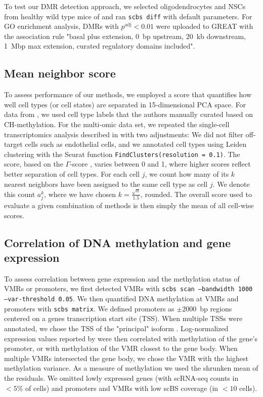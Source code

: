 \documentclass[twocolumn,10pt]{article}
\begin{document}
To test our DMR detection approach, we selected oligodendrocytes and NSCs from healthy wild type mice of \citet{kremer_scnmt} and ran \texttt{scbs diff} with default parameters.
For GO enrichment analysis, DMRs with $p^\text{adj}<0.01$ were uploaded to GREAT \citep{mclean2010great} with the association rule "basal plus extension, 0~bp upstream, 20~kb downstream, 1~Mbp max extension, curated regulatory domains included".

\subsection{Mean neighbor score} \label{methods:score}
To assess performance of our methods, we employed a score that quantifies how well cell types (or cell states) are separated in 15-dimensional PCA space.
For data from \citet{luo2017single}, we used cell type labels that the authors manually curated based on CH-methylation.
For the multi-omic data set, we repeated the single-cell transcriptomics analysis described in \citet{kremer_scnmt} with two adjustments:
We did not filter off-target cells such as endothelial cells, and we annotated cell types using Leiden clustering with the Seurat \citep{seurat} function \texttt{FindClusters(resolution = 0.1)}.
The score, based on the $\Gamma$-score \citep{Kireeva_2014}, varies between 0 and 1, where higher scores reflect better separation of cell types.
For each cell $j$, we count how many of its $k$ nearest neighbors have been assigned to the same cell type as cell $j$.
We denote this count $a^k_j$, where we have chosen $k=\frac{\sqrt{n}}{1.5}$, rounded.
The overall score used to evaluate a given combination of methods is then simply the mean of all cell-wise scores.

\subsection{Correlation of DNA methylation and gene expression}
To assess correlation between gene expression and the methylation status of VMRs or promoters, we first detected VMRs with \texttt{scbs scan --bandwidth 1000 --var-threshold 0.05}.
We then quantified DNA methylation at VMRs and promoters with \texttt{scbs matrix}.
We defined promoters as $\pm2000$~bp regions centered on a genes transcription start site (TSS).
When multiple TSSs were annotated, we chose the TSS of the "principal" isoform \citep{appris}.
Log-normalized expression values reported by \citet{kremer_scnmt} were then correlated with methylation of the gene's promoter, or with methylation of the VMR closest to the gene body.
When multiple VMRs intersected the gene body, we chose the VMR with the highest methylation variance.
As a measure of methylation we used the shrunken mean of the residuals.
We omitted lowly expressed genes (with scRNA-seq counts in $<5\%$ of cells) and promoters and VMRs with low scBS coverage (in $<10$ cells).
\end{document}
